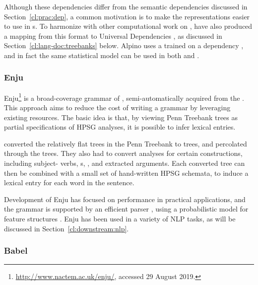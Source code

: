 \documentclass[output=paper
                ,modfonts
                ,nonflat
	        ,collection
	        ,collectionchapter
	        ,collectiontoclongg
 	        ,biblatex
                ,babelshorthands
                ,newtxmath
                ,draftmode
                ,colorlinks, citecolor=brown
]{./langsci/langscibook}
\begin{document}
Although these dependencies differ from the semantic dependencies discussed in Section~\ref{cl:prac:dep},
a common motivation is to make the representations easier to use in s.
To harmonize with other computational work on ,
\citet{Bou:Van:17} have also produced a mapping from this format
to Universal Dependencies \citep[UD;][]{Niv:Mar:Gin:16},
as discussed in Section~\ref{cl:lang-doc:treebanks} below.
Alpino uses a  trained on a dependency ,
and in fact the same statistical model can be used in both  and 
\citep{dekok2011reversible}.

\subsubsection{Enju}
\label{cl:other:enju}


Enju\footnote{%
	\url{http://www.nactem.ac.uk/enju/}, accessed 29 August 2019.
} \citep{MNT2005a-u}
is a broad-coverage grammar of ,
semi-automatically acquired from the  \citep{Mar:San:Mar:93}.
This approach aims to reduce the cost of writing a grammar
by leveraging existing resources.
The basic idea is that, by viewing Penn Treebank trees as partial specifications of HPSG analyses,
it is possible to infer lexical entries.

\citeauthor{MNT2005a-u} converted the relatively flat trees in the Penn Treebank to  trees,
and percolated  through the trees.
They also had to convert analyses for certain constructions,
including subject- verbs, s, , and extracted arguments.
Each converted tree can then be combined with a small set of hand-written HPSG schemata,
to induce a lexical entry for each word in the sentence.

Development of Enju has focused on performance in practical applications,
and the grammar is supported by an efficient parser \citep{tsuruoka2004enju,matsuzaki2007supertag},
using a probabilistic model for feature structures \citep{MT2008a-u}.
Enju has been used in a variety of NLP tasks, as will be discussed in Section~\ref{cl:downstream:nlp}.

\subsubsection{Babel}
\label{cl:other:babel}
\end{document}
